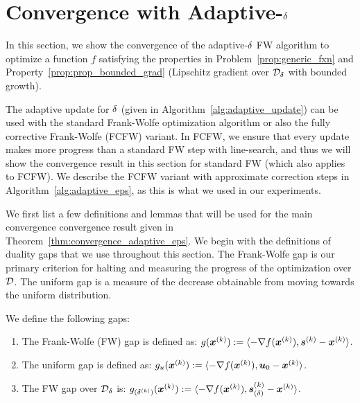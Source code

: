 \section{Convergence with Adaptive-$\delta$ \label{sec:theory_adaptive_eps}}

In this section, we show the convergence of the adaptive-$\delta$ FW algorithm
to optimize a function $f$ satisfying the properties in Problem~\ref{prop:generic_fxn} and Property~\ref{prop:prop_bounded_grad} (Lipschitz gradient over $\mathcal{D}_{\delta}$ with bounded growth).

The adaptive update for $\delta$ (given in Algorithm~\ref{alg:adaptive_update}) can
be used with the standard Frank-Wolfe optimization algorithm or also the fully corrective Frank-Wolfe (FCFW) variant. In FCFW, we ensure that every update makes more progress than a standard FW step with line-search, and thus we will show the convergence result in this section for standard FW (which also applies to FCFW). We describe the FCFW variant with approximate correction steps in Algorithm~\ref{alg:adaptive_eps}, as this is what we used in our experiments.

We first list a few definitions and lemmas that will be used for the main convergence convergence result given in Theorem~\ref{thm:convergence_adaptive_eps}.
We begin with the definitions of duality gaps that we use throughout this section. The Frank-Wolfe 
gap is our primary criterion for halting and measuring the progress of the optimization over $\mathcal{D}$.
The uniform gap is a measure of the decrease obtainable from moving towards the uniform distribution.

\begin{definition}
	\label{prop:g_k_properties_true}
	We define the following gaps:
	\begin{enumerate}
	\item The Frank-Wolfe (FW) gap is defined as:
	$g(\bm{x}^{(k)}) :=  \langle-\nabla f(\bm{x}^{(k)}),\bm{s}^{(k)}-\bm{x}^{(k)}\rangle$. 

	\item The uniform gap is defined as:
	$g_u(\bm{x}^{(k)}) := \langle-\nabla f(\bm{x}^{(k)}),\bm{u}_0-\bm{x}^{(k)}\rangle$. 
	
	\item The FW gap over $\mathcal{D}_{\delta}$ is:
	$g_{(\delta^{(k)})}(\bm{x}^{(k)}) := \langle-\nabla f(\bm{x}^{(k)}),\bm{s}^{(k)}_{(\delta)}-\bm{x}^{(k)}\rangle$. 
	\end{enumerate}
\end{definition}

